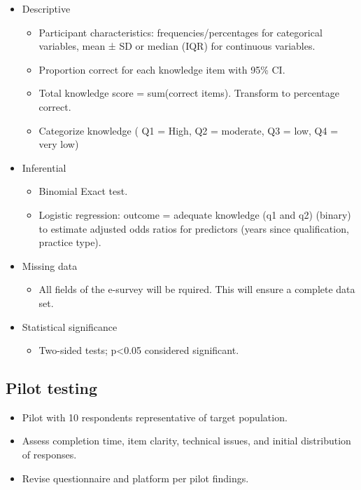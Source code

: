 \documentclass[
  letterpaper,
  DIV=11,
  numbers=noendperiod]{scrartcl}
\providecommand{\tightlist}{%
  \setlength{\itemsep}{0pt}\setlength{\parskip}{0pt}}
\begin{document}
\begin{itemize}
\item
  Descriptive

  \begin{itemize}
  \item
    Participant characteristics: frequencies/percentages for categorical
    variables, mean ± SD or median (IQR) for continuous variables.
  \item
    Proportion correct for each knowledge item with 95\% CI.
  \item
    Total knowledge score = sum(correct items). Transform to percentage
    correct.
  \item
    Categorize knowledge ( Q1 = High, Q2 = moderate, Q3 = low, Q4 = very
    low)
  \end{itemize}
\item
  Inferential

  \begin{itemize}
  \item
    Binomial Exact test.
  \item
    Logistic regression: outcome = adequate knowledge (q1 and q2)
    (binary) to estimate adjusted odds ratios for predictors (years
    since qualification, practice type).
  \end{itemize}
\item
  Missing data

  \begin{itemize}
  \tightlist
  \item
    All fields of the e-survey will be rquired. This will ensure a
    complete data set.
  \end{itemize}
\item
  Statistical significance

  \begin{itemize}
  \tightlist
  \item
    Two-sided tests; p\textless0.05 considered significant.
  \end{itemize}
\end{itemize}

\subsection{Pilot testing}\label{pilot-testing}

\begin{itemize}
\item
  Pilot with 10 respondents representative of target population.
\item
  Assess completion time, item clarity, technical issues, and initial
  distribution of responses.
\item
  Revise questionnaire and platform per pilot findings.
\end{itemize}
\end{document}
